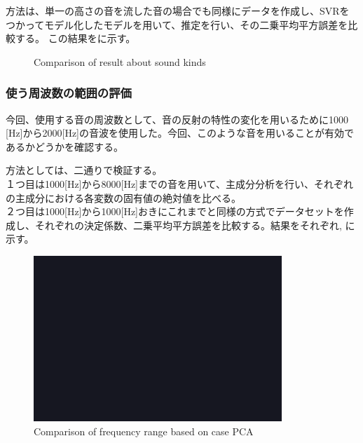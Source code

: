 方法は、単一の高さの音を流した音の場合でも同様にデータを作成し、SVRをつかってモデル化したモデルを用いて、推定を行い、その二乗平均平方誤差を比較する。
この結果をに示す。

\begin{figure}[tb]
    \centering
    \label{fig:1000[Hz]}
    \label{fig:2000[Hz]}
    \caption{Comparison of result about sound kinds}
    \label{fig:result_sound_kind}
\end{figure}

\subsubsection{使う周波数の範囲の評価}
\label{sec:result_svr_freq_renge}
今回、使用する音の周波数として、音の反射の特性の変化を用いるために1000 [Hz]から2000[Hz]の音波を使用した。今回、このような音を用いることが有効であるかどうかを確認する。

方法としては、二通りで検証する。\\
１つ目は1000[Hz]から8000[Hz]までの音を用いて、主成分分析を行い、それぞれの主成分における各変数の固有値の絶対値を比べる。\\
２つ目は1000[Hz]から1000[Hz]おきにこれまでと同様の方式でデータセットを作成し、それぞれの決定係数、二乗平均平方誤差を比較する。結果をそれぞれ, に示す。

\begin{figure}[tb]
  \begin{center}
  \vspace{1zh}
    \includegraphics[width=0.4\linewidth]{images/fig_sample.png}   
  \end{center}
  \caption{Comparison of frequency range based on case PCA}
  \label{fig:result_freq_range_1}
\end{figure}

